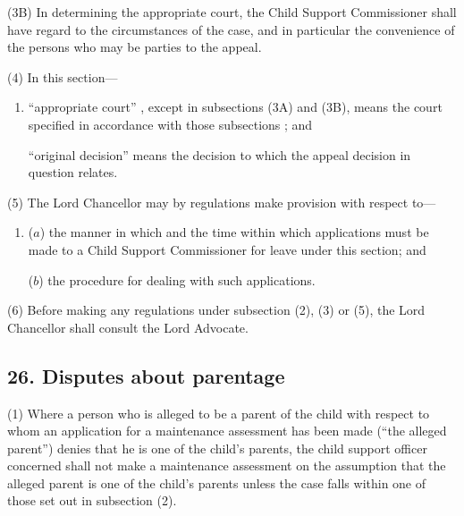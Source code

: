 \documentclass[12pt,a4paper]{article}
\begin{document}
(3B) In determining the appropriate court, the Child Support Commissioner shall have regard to the circumstances of the case, and in particular the convenience of the persons who may be parties to the appeal.

(4) In this section—
\begin{enumerate}\item[]
    “appropriate court”%
, except in subsections (3A) and (3B), means the court specified in accordance with those subsections%
; and

    “original decision” means the decision to which the appeal decision in question relates. 
\end{enumerate}

(5) The Lord Chancellor may by regulations make provision with respect to—
\begin{enumerate}\item[]
($a$) the manner in which and the time within which applications must be made to a Child Support Commissioner for leave under this section; and

($b$) the procedure for dealing with such applications.
\end{enumerate}

(6) Before making any regulations under subsection (2), (3)  or (5), the Lord Chancellor shall consult the Lord Advocate.


\subsection{26. Disputes about parentage}

(1) Where a person who is alleged to be a parent of the child with respect to whom an application for a maintenance assessment has been made (“the alleged parent”) denies that he is one of the child’s parents, the child support officer concerned shall not make a maintenance assessment on the assumption that the alleged parent is one of the child’s parents unless the case falls within one of those set out in subsection (2).
\end{document}
